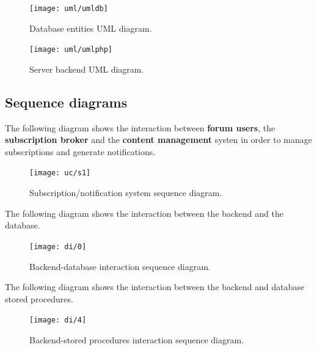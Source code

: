 \documentclass[12pt]{report}
\renewcommand\emph{\textbf}
\begin{document}
                \begin{figure}[H]
                \caption{Database entities UML diagram.}
                \centering
                \texttt{[image: uml/umldb]}
                \end{figure}

                \newpage

                \begin{figure}[H]
                \caption{Server backend UML diagram.}
                \centering
                \texttt{[image: uml/umlphp]}
                \end{figure}

                \newpage
                \newpage

            \subsection{Sequence diagrams}                    

                The following diagram shows the interaction between \emph{forum users}, the \emph{subscription broker} and the \emph{content management} systen in order to manage subscriptions and generate notifications.

                \begin{figure}[H]
                \caption{Subscription/notification system sequence diagram.}
                \centering
                \texttt{[image: uc/s1]}
                \end{figure}

                \newpage

                The following diagram shows the interaction between the backend and the database.

                \begin{figure}[H]
                \caption{Backend-database interaction sequence diagram.}
                \centering
                \texttt{[image: di/0]}
                \end{figure}

                \newpage

                The following diagram shows the interaction between the backend and database stored procedures.

                \begin{figure}[H]
                \caption{Backend-stored procedures interaction sequence diagram.}
                \centering
                \texttt{[image: di/4]}
                \end{figure}
\end{document}
